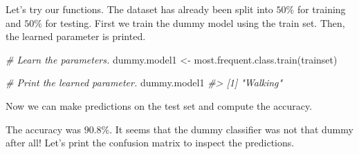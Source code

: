 \documentclass[
  11pt,
]{krantz}
\newenvironment{Shaded}{\begin{snugshade}}{\end{snugshade}}
\newcommand{\CommentTok}[1]{\textcolor[rgb]{0.37,0.37,0.37}{\textit{#1}}}
\newcommand{\FunctionTok}[1]{\textcolor[rgb]{0,0,0}{#1}}
\newcommand{\NormalTok}[1]{#1}
\newcommand{\OtherTok}[1]{\textcolor[rgb]{0.37,0.37,0.37}{#1}}
\newcommand{\SpecialCharTok}[1]{\textcolor[rgb]{0,0,0}{#1}}
\newcommand{\StringTok}[1]{\textcolor[rgb]{0.5,0.5,0.5}{#1}}
\begin{document}
Let's try our functions. The dataset has already been split into \(50\%\) for training and \(50\%\) for testing. First we train the dummy model using the train set. Then, the learned parameter is printed.

\begin{Shaded}
\begin{Highlighting}[]
\CommentTok{\# Learn the parameters.}
\NormalTok{dummy.model1 }\OtherTok{\textless{}{-}} \FunctionTok{most.frequent.class.train}\NormalTok{(trainset)}

\CommentTok{\# Print the learned parameter.}
\NormalTok{dummy.model1}
\CommentTok{\#\textgreater{} [1] "Walking"}
\end{Highlighting}
\end{Shaded}

Now we can make predictions on the test set and compute the accuracy.

\begin{Shaded}
\end{Shaded}

The accuracy was \(90.8\%\). It seems that the dummy classifier was not that dummy after all! Let's print the confusion matrix to inspect the predictions.

\begin{Shaded}
\end{Shaded}
\end{document}
